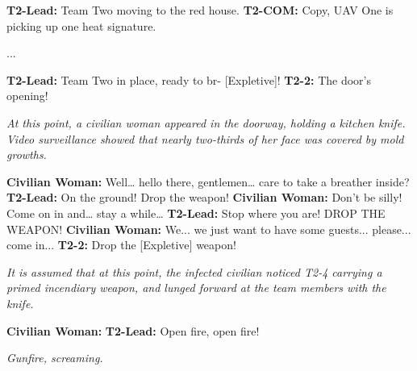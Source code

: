 \begin{boxedminipage}{\textwidth}
\begin{flushleft}

\textbf{T2-Lead:} Team Two moving to the red house.\linebreak
\textbf{T2-COM:} Copy, UAV One is picking up one heat signature.\linebreak

...\linebreak

\textbf{T2-Lead:} Team Two in place, ready to br- [Expletive]!\linebreak
\textbf{T2-2:} The door's opening!\linebreak

\textsl{At this point, a civilian woman appeared in the doorway, holding a kitchen knife. Video surveillance showed that nearly two-thirds of her face was covered by mold growths.}\linebreak

\textbf{Civilian Woman:} Well… hello there, gentlemen… care to take a breather inside?\linebreak
\textbf{T2-Lead:} On the ground! Drop the weapon!\linebreak
\textbf{Civilian Woman:} Don't be silly! Come on in and… stay a while…\linebreak
\textbf{T2-Lead:} Stop where you are! DROP THE WEAPON!\linebreak
\textbf{Civilian Woman:} We... we just want to have some guests... please... come in...\linebreak
\textbf{T2-2:} Drop the [Expletive] weapon!\linebreak

\textsl{It is assumed that at this point, the infected civilian noticed T2-4 carrying a primed incendiary weapon, and lunged forward at the team members with the knife.}\linebreak

\textbf{Civilian Woman:} \expunged \linebreak
\textbf{T2-Lead:} Open fire, open fire!\linebreak

\textsl{Gunfire, screaming.}
\end{flushleft}
\end{boxedminipage}